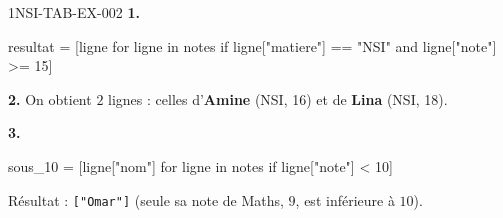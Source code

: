 \begin{corrige}{1NSI-TAB-EX-002}
\textbf{1.}
\begin{python}
resultat = [ligne for ligne in notes if ligne["matiere"] == "NSI" and ligne["note"] >= 15]
\end{python}

\textbf{2.} On obtient $2$ lignes : celles d'\textbf{Amine} (NSI, 16) et de \textbf{Lina}
(NSI, 18).

\textbf{3.}
\begin{python}
sous_10 = [ligne["nom"] for ligne in notes if ligne["note"] < 10]
\end{python}
Résultat : \lstinline{["Omar"]} (seule sa note de Maths, $9$, est inférieure à $10$).
\end{corrige}
